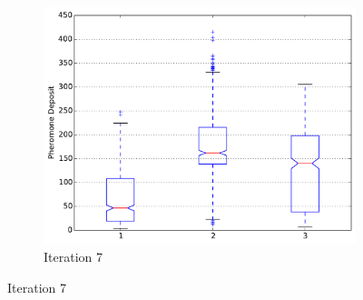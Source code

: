 \documentclass{llncs}
\begin{document}
\begin{figure}[H]
\begin{subfigure}[b]{0.3\textwidth}
                \includegraphics[width=\textwidth]{PLT/Comparision/BOXPLOT/Iteration7}
                \caption{Iteration 7}
                \label{fig:plt_iter7}
        \end{subfigure}
        
        \vspace{5mm}
        

\end{figure}
\end{document}
